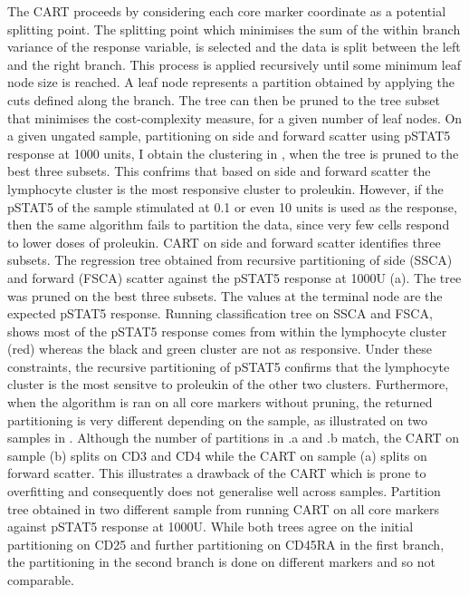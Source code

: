 The \gls{CART} proceeds by considering each core marker coordinate as a potential splitting point.
The splitting point which minimises the sum of the within branch variance of the response variable,
is selected and the data is split between the left and the right branch.
This process is applied recursively until some minimum leaf node size is reached.
A leaf node represents a partition obtained by applying the cuts defined along the branch.
The tree can then be pruned to the tree subset that minimises the cost-complexity measure, for a given number of leaf nodes.
On a given ungated sample, partitioning on side and forward scatter using pSTAT5 response at 1000 units,
I obtain the clustering in ,
when the tree is pruned to the best three subsets.
This confrims that based on side and forward scatter the lymphocyte cluster is the most responsive cluster to proleukin.
However, if the pSTAT5 of the sample stimulated at 0.1 or even 10 units is used as the response, then the same algorithm
fails to partition the data, since very few cells respond to lower doses of proleukin.
{ \gls{CART} on side and forward scatter identifies three subsets. }
{
The regression tree obtained from recursive partitioning of side (SSCA) and forward (FSCA) scatter against the pSTAT5 response at 1000U (a).
The tree was pruned on the best three subsets.
The values at the terminal node are the expected pSTAT5 response.
Running classification tree on SSCA and FSCA, shows most of the pSTAT5 response comes from within the lymphocyte cluster (red) whereas
the black and green cluster are not as responsive.
Under these constraints, the recursive partitioning of pSTAT5 confirms that the lymphocyte cluster is the most sensitve to proleukin
of the other two clusters.
} 
Furthermore, when the algorithm is ran on all core markers without pruning, 
the returned partitioning is very different depending on the sample, as illustrated on
two samples in .
Although the number of partitions in .a and .b
match, the CART on sample (b) splits on CD3 and CD4 while the CART on sample (a) splits on forward scatter.
This illustrates a drawback of the CART which is prone to overfitting and consequently does not generalise well across samples.
{ Partition tree obtained in two different sample from running CART on all core markers against pSTAT5 response at 1000U. }
{
  While both trees agree on the initial partitioning on CD25 and further partitioning on CD45RA in the first branch,
  the partitioning in the second branch is done on different markers and so not comparable.
}


